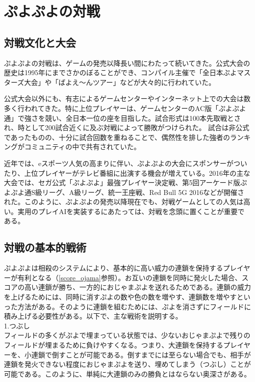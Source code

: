 \documentclass[12pt]{jreport}
\begin{document}
\section{ぷよぷよの対戦}
\subsection{対戦文化と大会}
ぷよぷよの対戦は、ゲームの発売以降長い間にわたって続いてきた。公式大会の歴史は1995年にまでさかのぼることができ、コンパイル主催で「全日本ぷよマスターズ大会」や「ばよえ～んツアー」などが大々的に行われていた。

公式大会以外にも、有志によるゲームセンターやインターネット上での大会は数多く行われてきた。特に上位プレイヤーは、ゲームセンターのAC版「ぷよぷよ通」で強さを競い、全日本一位の座を目指した。試合形式は100本先取戦とされ、時として200試合近くに及ぶ対戦によって勝敗がつけられた。
試合は非公式であったものの、十分に試合回数を重ねることで、偶然性を排した強者のランキングがコミュニティの中で共有されていた。

近年では、eスポーツ人気の高まりに伴い、ぷよぷよの大会にスポンサーがついたり、上位プレイヤーがテレビ番組に出演する機会が増えている。2016年の主な大会では、セガ公式「ぷよぷよ」最強プレイヤー決定戦\cite{sega}、第5回アーケード版ぷよぷよ通S級リーグ\cite{Skyuu}、A級リーグ\cite{Akyuu}、統一王座戦\cite{touituouza}、Red Bull 5G 2016\cite{5g}などが開催された。このように、ぷよぷよの発売以降現在でも、対戦ゲームとしての人気は高い。実用のプレイAIを実装するにあたっては、対戦を念頭に置くことが重要である。

\subsection{対戦の基本的戦術} \label{senzyutu}
ぷよぷよは相殺のシステムにより、基本的に高い威力の連鎖を保持するプレイヤーが有利となる（\ref{score_ojama}参照）。お互いの連鎖を同時に発火した場合、スコアの高い連鎖が勝ち、一方的におじゃまぷよを送れるためである。連鎖の威力を上げるためには、同時に消すぷよの数や色の数を増やす、連鎖数を増やすといった方法がある。そのように連鎖を組むためには、ぷよを消さずにフィールドに積み上げる必要性がある。以下で、主な戦術を説明する。
\\[.5em]

1.つぶし\\
フィールドの多くがぷよで埋まっている状態では、少ないおじゃまぷよで残りのフィールドが埋まるために負けやすくなる。つまり、大連鎖を保持するプレイヤーを、小連鎖で倒すことが可能である。倒すまでには至らない場合でも、相手が連鎖を発火できない程度におじゃまぷよを送り、埋めてしまう（つぶし）ことが可能である。このように、単純に大連鎖のみの勝負とはならない奥深さがある。
\\[.5em]
\end{document}

